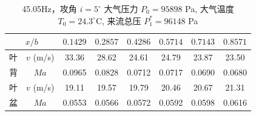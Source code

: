 \begin{table}[H]
  \centering
  \caption[45.05Hz 攻角 $i=5^\circ$ v/Ma 数据]{45.05Hz，攻角 $i=5^\circ$ 大气压力 $P_0=95898$ Pa, 大气温度 $T_0=24.3^\circ\text{C}$, 来流总压 $P_1^*=96148$ Pa}
  \label{tab:exp4_vma_45.05Hz_5}
  \renewcommand{\arraystretch}{1.2}
  \begin{tabular}{cccccccc}
    \toprule
    \multicolumn{2}{c}{$x/b$} & $0.1429$ & $0.2857$ & $0.4286$ & $0.5714$ & $0.7143$ & $0.8571$ \\
    \midrule
    叶 & $v$ (m/s) & 33.36 & 28.62 & 24.61 & 24.79 & 23.87 & 23.50 \\
    背 & $Ma$ & 0.0965 & 0.0828 & 0.0712 & 0.0717 & 0.0690 & 0.0680 \\
    \midrule
    叶 & $v$ (m/s) & 19.11 & 19.57 & 19.79 & 20.46 & 20.67 & 21.31 \\
    盆 & $Ma$ & 0.0553 & 0.0566 & 0.0572 & 0.0592 & 0.0598 & 0.0616 \\
    \bottomrule
  \end{tabular}
\end{table}